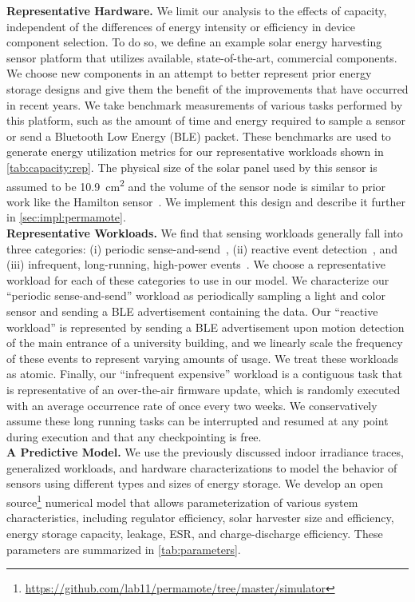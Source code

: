 \vspace{-6pt}
\noindent
\textbf{Representative Hardware.}
We limit our analysis to the effects of capacity,
independent of the differences of energy intensity or efficiency in device
component selection. To do so, we define an example solar energy harvesting
sensor platform that utilizes available, state-of-the-art, commercial
components.
We choose new
components in an attempt to better represent prior energy storage designs and
give them the benefit of the improvements that have occurred in recent years.
We take benchmark
measurements of various tasks performed by this platform, such as the
amount of time and energy required to sample a sensor or send a Bluetooth Low
Energy (BLE) packet. These benchmarks are used to generate energy utilization metrics
for our representative workloads shown in \cref{tab:capacity:rep}.
The physical size of the solar panel used by this sensor
is assumed to be
10.9~cm\textsuperscript{2} and the volume of the sensor node is similar to prior
work like the Hamilton sensor~\cite{kim2018system}.
We implement this design and describe it further in \cref{sec:impl:permamote}.
\\

\vspace{-6pt}
\noindent
\textbf{Representative Workloads.}
We find that sensing workloads generally fall into three
categories: (i) periodic sense-and-send~\cite{mainwaring2002wireless}, (ii) reactive event detection~\cite{campbellEnergy14}, and (iii) infrequent,
long-running, high-power events~\cite{levis2004trickle}. We choose a representative workload for each
of these categories to use in our model.
We characterize our ``periodic sense-and-send''
workload as periodically sampling a light and color sensor and sending a
BLE
advertisement containing the data.
Our ``reactive workload'' is
represented by sending a BLE advertisement upon motion detection of the main
entrance of a university building, and we linearly scale the frequency
of these events to represent varying amounts of usage. We treat these
workloads as atomic.  Finally, our ``infrequent expensive'' workload is a
contiguous
task that is representative of an
over-the-air firmware update, which is randomly executed with an average occurrence rate
of once every two weeks.
We conservatively assume these long running tasks can be interrupted
and resumed at any point during execution and that any checkpointing is free.
\\

\vspace{-6pt}
\noindent
\textbf{A Predictive Model.}
We use the previously discussed indoor irradiance traces, generalized
workloads, and hardware characterizations to model the behavior of sensors
using different types and sizes of energy storage. We develop an open
source\footnote{\url{https://github.com/lab11/permamote/tree/master/simulator}}
numerical model that allows parameterization of various system
characteristics, including regulator efficiency, solar harvester size
and efficiency, energy storage capacity, leakage, ESR, and charge-discharge
efficiency. These parameters are summarized in \cref{tab:parameters}.

